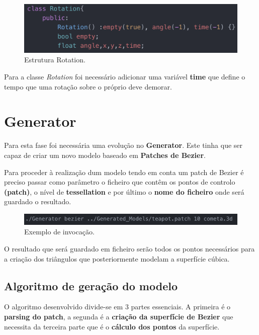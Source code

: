 \documentclass[a4paper]{article}
\begin{document}
\begin{figure}[H]
\centering
\includegraphics[scale=0.75]{rotation.png}
\caption{Estrutura Rotation.}
\label{img:rotation}
\end{figure}

Para a classe \textit{Rotation} foi necessário adicionar uma variável \textbf{time} que define o tempo que uma rotação sobre o próprio deve demorar.



\section{Generator}
\label{sec:generator}

Para esta fase foi necessária uma evolução no \textbf{Generator}. Este tinha que ser capaz de criar um novo modelo baseado em \textbf{Patches de Bezier}.

Para proceder à realização dum modelo tendo em conta um patch de Bezier é preciso passar como parâmetro o ficheiro que contêm os pontos de controlo  \textbf{(patch)}, o nível de \textbf{tessellation} e por último o \textbf{nome do ficheiro} onde será guardado o resultado.

\begin{figure}[H]
\centering
\includegraphics[scale=0.75]{bezier_command.png}
\caption{Exemplo de invocação.}
\label{img:bezier_command}
\end{figure}

O resultado que será guardado em ficheiro serão todos os pontos necessários para a criação dos triângulos que posteriormente modelam a superfície cúbica.

\subsection{Algoritmo de geração do modelo}
\label{sec:bezier}

O algoritmo desenvolvido divide-se em 3 partes essenciais. A primeira é o \textbf{parsing do patch}, a segunda é a \textbf{criação da superfície de Bezier} que necessita da terceira parte que é o \textbf{cálculo dos pontos} da superfície.
\end{document}
